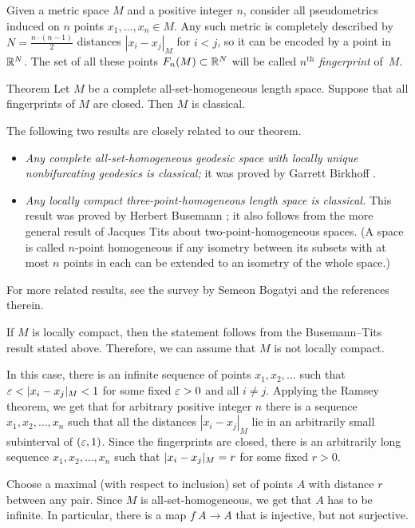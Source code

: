 \documentclass[a4paper,10pt]{article}
\begin{document}
Given a metric space $M$ and a positive integer $n$, consider all pseudometrics induced on $n$ points $x_1,\dots, x_n\in M$.
Any such metric is completely described by $N=\tfrac{n\cdot (n-1)}2$ distances $|x_i-x_j|_M$ for $i<j$, so it can be encoded by a point in $\mathbb{R}^N$.
The set of all these points $F_n(M)\subset \mathbb{R}^N$ will be called \emph{$n^\text{th}$ fingerprint} of~$M$.

\begin{thm}{Theorem}\label{all-sets}
Let $M$ be a complete all-set-homogeneous length space.
Suppose that all fingerprints of $M$ are closed.
Then $M$ is classical.
\end{thm}

The following two results are closely related to our theorem.
\begin{itemize}
\item \emph{Any complete all-set-homogeneous geodesic space with locally unique nonbifurcating geodesics is classical;} it was proved by Garrett Birkhoff \cite{birkhoff}.
\item \emph{Any locally compact three-point-homogeneous length space is classical.}
 This result was proved by Herbert Busemann \cite{busemann}; it also follows from the more general result of Jacques Tits \cite{tits} about two-point-homogeneous spaces.
 (A space is called $n$-point homogeneous if any isometry between its subsets with at most $n$ points in each can be extended to an isometry of the whole space.)
\end{itemize}
For more related results, see the survey by Semeon Bogatyi \cite{bogaty} and the references therein.

If $M$ is locally compact, then the statement follows from the Busemann--Tits result stated above.
Therefore, we can assume that $M$ is not locally compact.

In this case, there is an infinite sequence of points $x_1,x_2,\dots$ such that 
$\eps<|x_i-x_j|_M<1$ for some fixed $\varepsilon>0$ and all $i\ne j$.
Applying the Ramsey theorem, we get that for arbitrary positive integer $n$ there is a sequence $x_1,x_2,\dots,x_n$ such that all the distances
$|x_i-x_j|_M$ lie in an arbitrarily small subinterval of $(\varepsilon,1)$.
Since the fingerprints are closed, there is an arbitrarily long sequence 
$x_1,x_2,\dots,x_n$ such that 
$|x_i\z-x_j|_M= r$ for some fixed $r>0$.

Choose a maximal (with respect to inclusion) set of points $A$ with distance $r$ between any pair.
Since $M$ is all-set-homogeneous, we get that $A$ has to be infinite.
In particular, there is a map $f\:A\to A$ that is injective, but not surjective.
\end{document}
